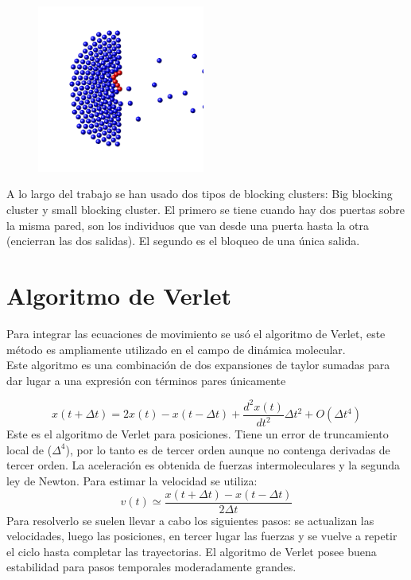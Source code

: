 \begin{figure}[H]
    \centering
    \includegraphics[height=5.5cm]{figuras/in_image_2_120000_bkg.png}
    \caption[width=5cm]{}
    \label{bc}
\end{figure}

A lo largo del trabajo se han usado dos tipos de blocking clusters: Big blocking cluster y small blocking cluster. El primero se tiene cuando hay dos puertas sobre la misma pared, son los individuos que van desde una puerta hasta la otra (encierran las dos salidas). El segundo es el bloqueo de una única salida. 

\section{Algoritmo de Verlet}

Para integrar las ecuaciones de movimiento se usó el algoritmo de Verlet, este método es ampliamente utilizado en el campo de dinámica molecular.\\
Este algoritmo es una combinación de dos expansiones de taylor sumadas para dar lugar a una expresión con términos pares únicamente~\cite{haile}

\begin{equation}
x(t+\Delta t)=2x(t)-x(t-\Delta t)+\frac{d^2x(t)}{dt^2} \Delta t^2+O(\Delta t^4)
\label{verlet_x}
\end{equation} 
Este es el algoritmo de Verlet para posiciones. Tiene un error de truncamiento local de ($\Delta^4$), por lo tanto es de tercer orden aunque no contenga derivadas de tercer orden. La aceleración es obtenida de fuerzas intermoleculares y la segunda ley de Newton.
Para estimar la velocidad se utiliza:
\begin{equation}
v(t)\simeq \frac{x(t+\Delta t)-x(t-\Delta t)}{2\Delta t}
\label{verlet_v}
\end{equation}
Para resolverlo se suelen llevar a cabo los siguientes pasos: se actualizan las velocidades, luego las posiciones, en tercer lugar las fuerzas y se vuelve a repetir el ciclo hasta completar las trayectorias. 
El algoritmo de Verlet posee buena estabilidad para pasos temporales moderadamente grandes.

